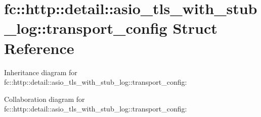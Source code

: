\hypertarget{structfc_1_1http_1_1detail_1_1asio__tls__with__stub__log_1_1transport__config}{}\section{fc\+:\+:http\+:\+:detail\+:\+:asio\+\_\+tls\+\_\+with\+\_\+stub\+\_\+log\+:\+:transport\+\_\+config Struct Reference}
\label{structfc_1_1http_1_1detail_1_1asio__tls__with__stub__log_1_1transport__config}


Inheritance diagram for fc\+:\+:http\+:\+:detail\+:\+:asio\+\_\+tls\+\_\+with\+\_\+stub\+\_\+log\+:\+:transport\+\_\+config\+:


Collaboration diagram for fc\+:\+:http\+:\+:detail\+:\+:asio\+\_\+tls\+\_\+with\+\_\+stub\+\_\+log\+:\+:transport\+\_\+config\+:
